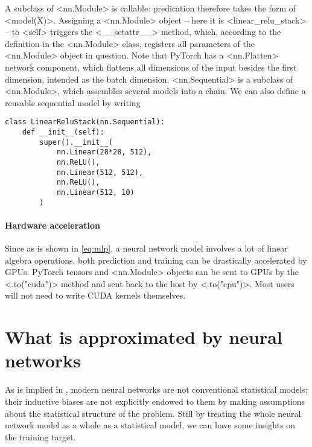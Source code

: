 \documentclass[hyperref, a4paper, 12pt]{report}
\def\texttt#1{<#1>}%
\newcommand{\shortcode}[1]{\texttt{#1}}
\begin{document}
A subclass of \shortcode{nn.Module} is callable:
predication therefore takes the form of \shortcode{model(X)}.
Assigning a \shortcode{nn.Module} object -- here it is \shortcode{linear_relu_stack} -- to \shortcode{self} triggers the \shortcode{__setattr__} method,
which, according to the definition in the \shortcode{nn.Module} class,
registers all parameters of the \shortcode{nn.Module} object in question.
Note that PyTorch has a \shortcode{nn.Flatten} network component,
which flattens all dimensions of the input besides the first dimension,
intended as the batch dimension.
\shortcode{nn.Sequential} is a subclass of \shortcode{nn.Module},
which assembles several models into a chain.
We can also define a reusable sequential model by writing

\begin{lstlisting}
class LinearReluStack(nn.Sequential):
    def __init__(self):
        super().__init__(
            nn.Linear(28*28, 512),
            nn.ReLU(),
            nn.Linear(512, 512),
            nn.ReLU(),
            nn.Linear(512, 10)
        )
\end{lstlisting}

\paragraph*{Hardware acceleration}
Since as is shown in \eqref{eq:mlp}, a neural network model involves a lot of linear algebra operations,
both prediction and training can be drastically accelerated by GPUs.
PyTorch tensors and \shortcode{nn.Module} objects can be sent to GPUs
by the \shortcode{.to("cuda")} method and sent back to the host by \shortcode{.to("cpu")}.
Most users will not need to write CUDA kernels themselves.

\section{What is approximated by neural networks}\label{sec:framework.statistics}

As is implied in ,
modern neural networks are not conventional statistical models:
their inductive biases are not explicitly endowed to them by making assumptions about the statistical structure of the problem.
Still by treating the whole neural network model as a whole as a statistical model,
we can have some insights on the training target. 
\end{document}
